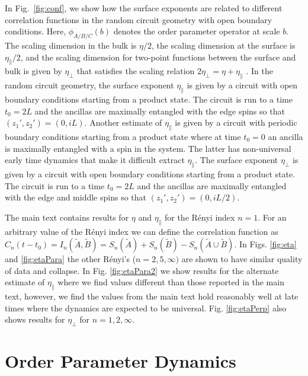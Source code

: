\documentclass[prl,twocolumn,aps,showpacs,amsmath,amssymb,superscriptaddress,floatfix,longbibliography]{revtex4-1}
\begin{document}
In Fig.~\ref{fig:conf}, we show how the surface exponents are related to different correlation functions in the random circuit geometry with open boundary conditions.  Here, $\phi_{A/B/C}(b)$ denotes the order parameter operator at scale $b$.  The scaling dimension in the bulk is $\eta/2$, the scaling dimension at the surface is $\eta_{\parallel}/2$, and the scaling dimension for two-point functions between the surface and bulk is given by
$\eta_{\perp}$ that satisfies the scaling relation $2 \eta_{\perp} = \eta + \eta_{\parallel}$ \cite{Binder83,Cardy84}.  In the random circuit geometry, the surface exponent $\eta_\parallel$ is given by a circuit with open boundary conditions starting from a product state.    The circuit is run to a time $t_0 = 2L$ and the ancillas are maximally entangled with the edge spins so that $(z_1',z_2')=(0,iL)$.  Another estimate of $\eta_\parallel$ is given by a circuit with periodic boundary conditions starting from a product state where at time $t_0 = 0$ an ancilla is maximally entangled with a spin in the system. The latter has non-universal early time dynamics that make it difficult extract $\eta_\parallel$. The surface exponent $\eta_\perp$ is given by a circuit with open boundary conditions starting from a product state. The circuit is run to a time $t_0 = 2L$ and the ancillas are maximally entangled with the edge and middle spins so that $(z_1',z_2')=(0,iL/2)$. 

The main text contains results for $\eta$ and $\eta_\parallel$ for the R\'enyi index $n = 1$. For an arbitrary value of the R\'enyi index we can define the correlation function as $C_n(t-t_0) = I_n(\tilde A,\tilde B) = S_n(\tilde A) + S_n(\tilde B)- S_n(\tilde A\cup \tilde B)$. In Figs. \ref{fig:eta} and \ref{fig:etaPara} the other R\'enyi's ($n = 2,5,\infty)$ are shown to have similar quality of data and collapse. In Fig. \ref{fig:etaPara2} we show results for the alternate estimate of $\eta_\parallel$ where we find values different than those reported in the main text, however, we find the values from the main text hold reasonably well at late times where the dynamics are expected to be universal. Fig. \ref{fig:etaPerp} also shows results for $\eta_\perp$ for $n = 1,2,\infty$.


\section{Order Parameter Dynamics}
\end{document}
